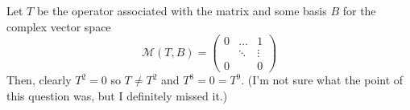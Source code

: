 \documentclass[10pt, twocolumn]{article}
\begin{document}
\begin{q}[8]
    Let $ T $ be the operator associated with the matrix and some basis $ B $ for the complex vector space 
    $$ \mathcal{M}(T, B) =\left(\begin{array}{ccc}0 & \dots & 1 \\ & \ddots & \vdots \\ 0 & & 0\end{array}\right) $$
    Then, clearly $ T^2 = 0 $ so $ T \neq T^2 $ and $ T^8 = 0 = T^9 $.
    (I'm not sure what the point of this question was, but I definitely missed it.)
\end{q}
\end{document}
